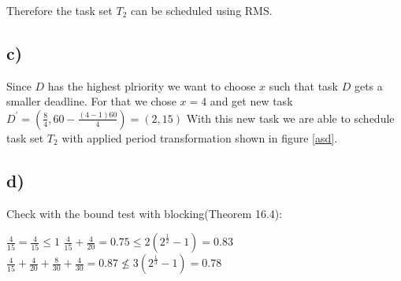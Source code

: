 \documentclass[10pt,a4paper]{article}
\begin{document}
Therefore the task set $T_2$ can be scheduled using RMS.

\subsection*{c)}
Since $D$ has the highest plriority we want to choose $x$ such that task $D$ gets a smaller deadline. 
For that we chose $x=4$ and get new task $D^\prime = (\frac{8}{4}, 60 - \frac{(4 - 1)60}{4}) = (2, 15)$
With this new task we are able to schedule task set $T_2$ with applied period transformation shown in figure \ref{asd}.

\subsection*{d)}
Check with the bound test with blocking(Theorem 16.4\cite{Fan:2015:RES:2800613}):

$\frac{4}{15} = \frac{4}{15} \leq 1$
\newline
$\frac{4}{15} + \frac{4}{20} = 0.75 \leq 2(2^{\frac{1}{2}} - 1) = 0.83 $
\newline
$\frac{4}{15} + \frac{4}{20} + \frac{8}{30} + \frac{4}{30} = 0.87 \nleq 3(2^{\frac{1}{3}} - 1) = 0.78$



\end{document}
